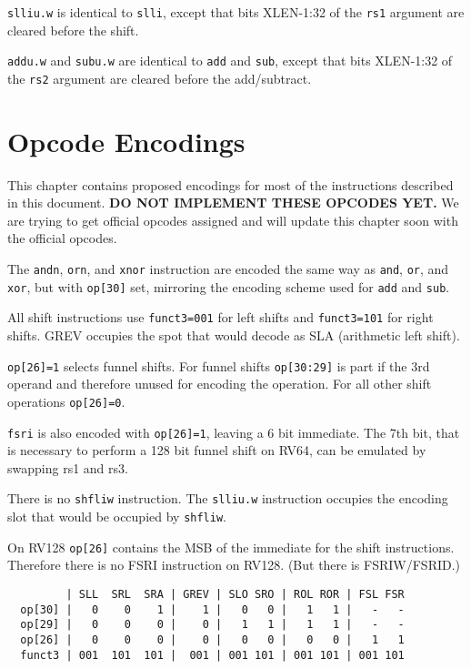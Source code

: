 {\tt slliu.w} is identical to {\tt slli}, except that bits XLEN-1:32 of the
{\tt rs1} argument are cleared before the shift.

{\tt addu.w} and {\tt subu.w} are identical to {\tt add} and {\tt sub}, except
that bits XLEN-1:32 of the {\tt rs2} argument are cleared before the add/subtract.





\section{Opcode Encodings}
\label{opcodes}

This chapter contains proposed encodings for most of the instructions described
in this document. {\bf DO NOT IMPLEMENT THESE OPCODES YET.} We are trying to get
official opcodes assigned and will update this chapter soon with the official
opcodes.

The {\tt andn}, {\tt orn}, and {\tt xnor} instruction are encoded the same way
as {\tt and}, {\tt or}, and {\tt xor}, but with {\tt op[30]} set, mirroring the
encoding scheme used for {\tt add} and {\tt sub}.

All shift instructions use {\tt funct3=001} for left shifts and {\tt funct3=101}
for right shifts. GREV occupies the spot that would decode as SLA (arithmetic
left shift).

{\tt op[26]=1} selects funnel shifts. For funnel shifts {\tt op[30:29]} is part
if the 3rd operand and therefore unused for encoding the operation. For all other
shift operations {\tt op[26]=0}.

{\tt fsri} is also encoded with {\tt op[26]=1}, leaving a 6 bit immediate. The 7th
bit, that is necessary to perform a 128 bit funnel shift on RV64, can be
emulated by swapping rs1 and rs3.

There is no {\tt shfliw} instruction. The {\tt slliu.w} instruction occupies
the encoding slot that would be occupied by {\tt shfliw}.

On RV128 {\tt op[26]} contains the MSB of the immediate for the shift instructions.
Therefore there is no FSRI instruction on RV128. (But there is FSRIW/FSRID.)

\begin{minipage}{\linewidth}
\begin{verbatim}
         | SLL  SRL  SRA | GREV | SLO SRO | ROL ROR | FSL FSR
  op[30] |   0    0    1 |    1 |   0   0 |   1   1 |   -   -
  op[29] |   0    0    0 |    0 |   1   1 |   1   1 |   -   -
  op[26] |   0    0    0 |    0 |   0   0 |   0   0 |   1   1
  funct3 | 001  101  101 |  001 | 001 101 | 001 101 | 001 101
\end{verbatim}
\end{minipage}


